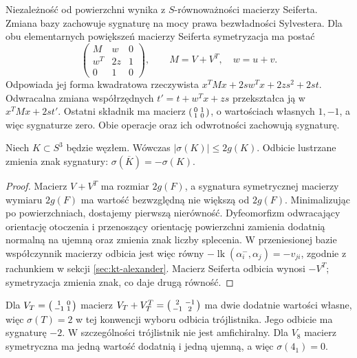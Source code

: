 Niezależność od powierzchni wynika z $S$-równoważności macierzy
Seiferta. Zmiana bazy zachowuje sygnaturę na mocy prawa
bezwładności Sylvestera. Dla obu elementarnych powiększeń
macierzy Seiferta symetryzacja ma postać
\[
\begin{pmatrix}M&w&0\\w^T&2z&1\\0&1&0\end{pmatrix},
\qquad M=V+V^T,\quad w=u+v.
\]
Odpowiada jej forma kwadratowa rzeczywista
$x^TMx+2s w^Tx+2zs^2+2st$.
Odwracalna zmiana współrzędnych $t'=t+w^Tx+zs$
przekształca ją w $x^TMx+2st'$.
Ostatni składnik ma macierz
$\begin{psmallmatrix}0&1\\1&0\end{psmallmatrix}$,
o wartościach własnych $1,-1$, a więc sygnaturze zero.
Obie operacje oraz ich odwrotności zachowują sygnaturę.

\begin{stwierdzenie}
Niech $K\subset S^3$ będzie węzłem. Wówczas
$|\sigma(K)|\leq2g(K)$.
Odbicie lustrzane zmienia znak sygnatury:
$\sigma(\overline K)=-\sigma(K)$.
\end{stwierdzenie}

\begin{proof}
Macierz $V+V^T$ ma rozmiar $2g(F)$, a sygnatura symetrycznej
macierzy wymiaru $2g(F)$ ma wartość bezwzględną nie większą
od $2g(F)$. Minimalizując po powierzchniach, dostajemy pierwszą
nierówność. Dyfeomorfizm odwracający orientację otoczenia
i przenoszący orientację powierzchni zamienia dodatnią
normalną na ujemną oraz zmienia znak liczby splecenia.
W przeniesionej bazie współczynnik macierzy odbicia jest
więc równy $-\operatorname{lk}(\alpha_i^-,\alpha_j)
=-v_{ji}$, zgodnie z rachunkiem w sekcji
\ref{sec:kt-alexander}. Macierz Seiferta odbicia wynosi
$-V^T$; symetryzacja zmienia znak, co daje drugą równość.
\end{proof}

\begin{przyklad}
Dla $V_T=\begin{psmallmatrix}1&0\\-1&1\end{psmallmatrix}$
macierz $V_T+V_T^T=\begin{psmallmatrix}2&-1\\-1&2\end{psmallmatrix}$
ma dwie dodatnie wartości własne, więc $\sigma(T)=2$
w tej konwencji wyboru odbicia trójlistnika. Jego odbicie
ma sygnaturę $-2$. W szczególności trójlistnik nie jest
amfichiralny. Dla $V_8$ macierz symetryczna ma jedną wartość
dodatnią i jedną ujemną, a więc $\sigma(4_1)=0$.
\end{przyklad}

